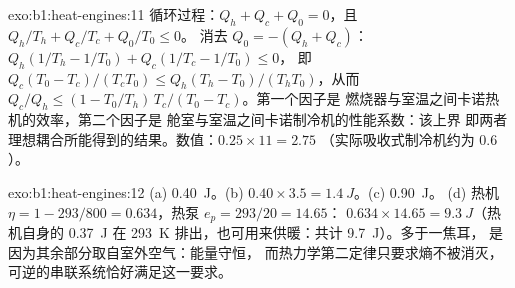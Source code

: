 \begin{solution}{exo:b1:heat-engines:11}
循环过程：$Q_h + Q_c + Q_0 = 0$，且 $Q_h/T_h + Q_c/T_c + Q_0/T_0 \leq 0$。
消去 $Q_0 = -(Q_h + Q_c)$：$Q_h(1/T_h - 1/T_0) + Q_c(1/T_c - 1/T_0) \leq 0$，
即 $Q_c(T_0 - T_c)/(T_cT_0) \leq Q_h(T_h - T_0)/(T_hT_0)$，从而
$Q_c/Q_h \leq (1 - T_0/T_h)\,T_c/(T_0 - T_c)$。第一个因子是
燃烧器与室温之间卡诺热机的效率，第二个因子是
舱室与室温之间卡诺制冷机的性能系数：该上界
即两者理想耦合所能得到的结果。数值：$0.25 \times 11 = 2.75$
（实际吸收式制冷机约为 $0.6$）。
\end{solution}

\begin{solution}{exo:b1:heat-engines:12}
(a) \qty{0.40}{J}。(b) $0.40 \times 3.5 = \qty{1.4}{J}$。(c) \qty{0.90}{J}。
(d) 热机 $\eta = 1 - 293/800 = 0.634$，热泵 $e_p = 293/20 = 14.65$：
$0.634 \times 14.65 = \qty{9.3}{J}$（热机自身的 \qty{0.37}{J}
在 \qty{293}{K} 排出，也可用来供暖：共计 \qty{9.7}{J}）。多于一焦耳，
是因为其余部分取自室外空气：能量守恒，
而热力学第二定律只要求熵不被消灭，
可逆的串联系统恰好满足这一要求。
\end{solution}

